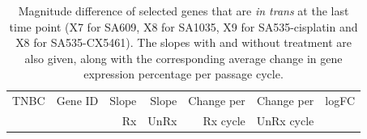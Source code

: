 \begin{table}[]
\centering
   \caption{Magnitude difference of selected genes that are \textit{in trans} at the last time point (X7 for SA609, X8 for SA1035, X9 for SA535-cisplatin and X8 for SA535-CX5461). The slopes with and without treatment are also given, along with the corresponding average change in gene expression percentage per passage cycle.}
{
\begin{tabular}{|llrrrrr|}
\hline
TNBC & Gene ID & Slope & Slope & Change per & Change per & logFC\\
 & & Rx & UnRx & Rx cycle & UnRx cycle &  \\


\end{tabular}}
\end{table}
